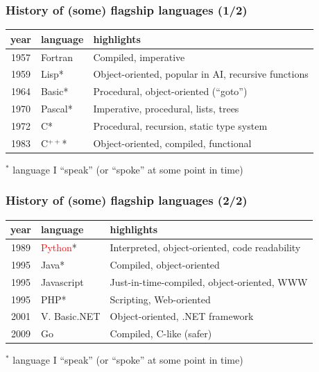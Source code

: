 \documentclass{beamer}
\newcommand{\red}[1]{\textcolor{red}{#1}}
\begin{document}
\begin{frame}
\frametitle{History of (some) flagship languages (1/2)}

\begin{center}
\begin{tabular}{clp{79mm}}
\hline
\bf year	& \bf language	& \bf highlights	\\
\hline
1957	& Fortran	& Compiled, imperative	\\
1959	& Lisp*		& Object-oriented, popular in AI, recursive functions	\\
1964	& Basic*	& Procedural, object-oriented (``goto'')	\\
1970	& Pascal*	& Imperative, procedural, lists, trees	\\
1972	& C*		& Procedural, recursion, static type system	\\
1983	& C$^{++}$*		& Object-oriented, compiled, functional	\\
\hline
\end{tabular}
\end{center}

\bigskip
$^*$ language I ``speak'' (or ``spoke'' at some point in time)
\end{frame}

\begin{frame}
\frametitle{History of (some) flagship languages (2/2)}

\begin{center}
\begin{tabular}{clp{79mm}}
\hline
\bf year	& \bf language	& \bf highlights	\\
\hline
1989	& \red{Python}*	& Interpreted, object-oriented, code readability	\\
1995	& Java*			& Compiled, object-oriented	\\
1995	& Javascript	&Just-in-time-compiled, object-oriented, WWW	\\
1995	& PHP*			& Scripting, Web-oriented	\\
2001	& V. Basic.NET	& Object-oriented, .NET framework	\\
2009	& Go			& Compiled, C-like (safer)	\\
\hline
\end{tabular}
\end{center}

\bigskip
$^*$ language I ``speak'' (or ``spoke'' at some point in time)
\end{frame}
\end{document}
